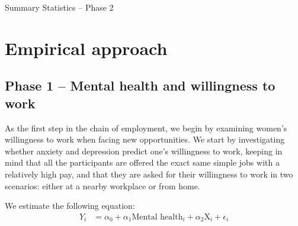\documentclass[12pt, a4paper, american]{article}
\begin{document}
\begin{table}[h]
\caption{Summary Statistics -- Phase 2}
\centering
\label{tab:summary_statistic_baseline}
\end{table}

\clearpage

\section{Empirical approach}\label{sec_empirical approach}
\subsection{Phase 1 -- Mental health and willingness to work}
As the first step in the chain of employment, we begin by examining women's willingness to work when facing new opportunities. We start by investigating whether anxiety and depression predict one's willingness to work, keeping in mind that all the participants are offered the exact same simple jobs with a relatively high pay, and that they are  asked for their willingness to work in two scenarios: either at a nearby workplace or from home.

We estimate the following equation:
\begin{equation}\label{eq_1}
\begin{aligned}
Y_{i} &= \alpha_0 + \alpha_1  \text{Mental health}_{i}  + \alpha_2 \text{X}_{i} + \epsilon_{i}
\end{aligned}
\end{equation}
\end{document}
